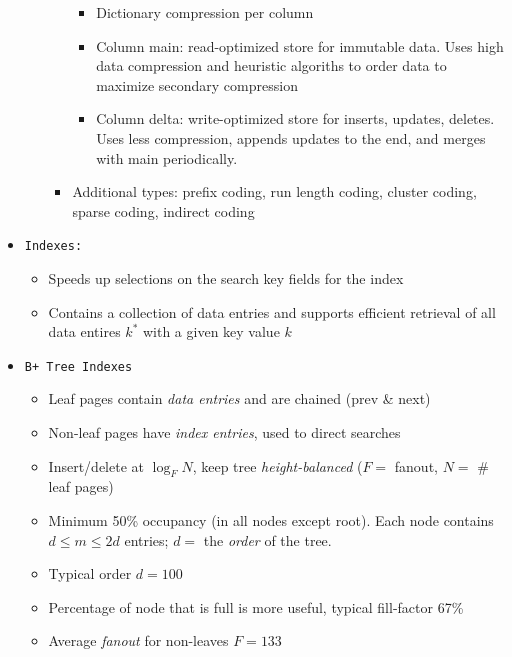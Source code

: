 \documentclass[landscape,8pt]{extarticle}
\newcommand{\code}{\lstinline}
\begin{document}
\begin{multicols}{5}
\begin{itemize}
\begin{itemize}
\begin{itemize}
\begin{itemize}
                                      \item Dictionary compression per column
                                      \item Column main: read-optimized store for immutable data. Uses high data compression and heuristic algoriths to order data to maximize secondary compression
                                      \item Column delta: write-optimized store for inserts, updates, deletes. Uses less compression, appends updates to the end, and merges with main periodically.
                                  \end{itemize}
                            \item Additional types: prefix coding, run length coding, cluster coding, sparse coding, indirect coding
                        \end{itemize}
              \end{itemize}
        \item \code{Indexes:}
              \begin{itemize}
                  \item Speeds up selections on the search key fields for the index
                  \item Contains a collection of data entries and supports efficient retrieval of all data entires $k^*$ with a given key value $k$
              \end{itemize}
        \item \code{B+ Tree Indexes}
              \begin{itemize}
                  \item Leaf pages contain \emph{data entries} and are chained (prev \& next)
                  \item Non-leaf pages have \emph{index entries}, used to direct searches
                  \item Insert/delete at $\log_F N$, keep tree \emph{height-balanced} ($F = $ fanout, $N = $ \# leaf pages)
                  \item Minimum 50\% occupancy (in all nodes except root). Each node contains $d \leq m \leq 2d$ entries; $d = $ the \emph{order} of the tree.
                  \item Typical order $d = 100$
                  \item Percentage of node that is full is more useful, typical fill-factor 67\%
                  \item Average \emph{fanout} for non-leaves $F = 133$

\end{itemize}
\end{itemize}
\end{multicols}
\end{document}
